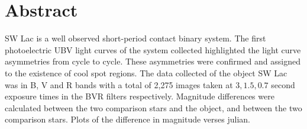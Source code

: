 \section{Abstract}
\label{sec:abstract}

SW Lac is a well observed short-period contact binary system. The first photoelectric 
UBV light curves of the system collected highlighted the light curve asymmetries from 
cycle to cycle. These asymmetries were confirmed and assigned to the existence of cool 
spot regions. The data collected of the object SW Lac was in B, V and R bands with a total 
of 2,275 images taken at $3, 1.5, 0.7$ second exposure times in the BVR filters respectively.
 Magnitude differences were calculated between the two comparison stars and the object, 
 and between the two comparison stars. Plots of the difference in magnitude verses julian.